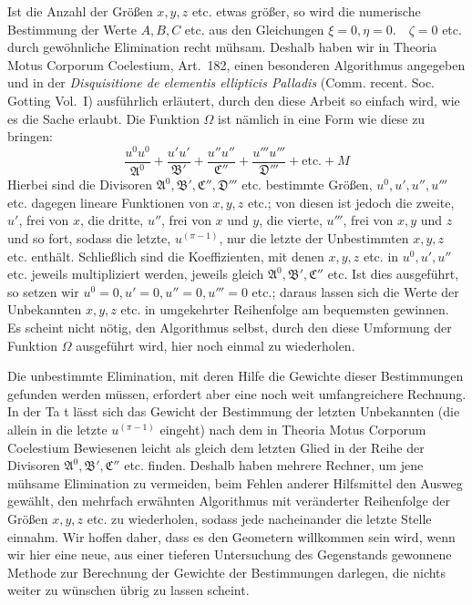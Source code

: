 Ist die Anzahl der Größen \(x,y,z\) etc. etwas größer, so wird die numerische Bestimmung der Werte \(A,B,C\) etc. aus den Gleichungen \(\xi=0,\allowbreak\eta=0.\quad\zeta=0\) etc. durch gewöhnliche Elimination recht mühsam. Deshalb haben wir in Theoria Motus Corporum Coelestium, Art.\ 182, einen besonderen Algorithmus angegeben und in der \textit{Disquisitione de elementis ellipticis Palladis} (Comm. recent. Soc. Gotting Vol.\ I) ausführlich erläutert, durch den diese Arbeit so einfach wird, wie es die Sache erlaubt. Die Funktion \(\Omega\) ist nämlich in eine Form wie diese zu bringen:
\[
\frac{u^0u^0}{\mathfrak{A}^0}+\frac{u'u'}{\mathfrak{B}'}+\frac{u''u''}{\mathfrak{C}''}+\frac{u'''u'''}{\mathfrak{D}'''}+\text{etc.}+M
\]
Hierbei sind die Divisoren \(\mathfrak{A}^0,\mathfrak{B}',\mathfrak{C}'',\mathfrak{D}'''\) etc. bestimmte Größen, \(u^0,u',u'',u'''\) etc. dagegen lineare Funktionen von \(x,y,z\) etc.; von diesen ist jedoch die zweite, \(u'\), frei von \(x\), die dritte, \(u''\), frei von \(x\) und \(y\), die vierte, \(u'''\), frei von \(x,y\) und \(z\) und so fort, sodass die letzte, \(u^{(\pi-1)}\), nur die letzte der Unbestimmten \(x,y,z\) etc. enthält. Schließlich sind die Koeffizienten, mit denen \(x,y,z\) etc. in \(u^0,u',u''\) etc. jeweils multipliziert werden, jeweils gleich \(\mathfrak{A}^0,\mathfrak{B}',\mathfrak{C}''\) etc. Ist dies ausgeführt, so setzen wir \(u^0=0,\allowbreak u'=0,\allowbreak u''=0,\allowbreak u'''=0\) etc.; daraus lassen sich die Werte der Unbekannten \(x,y,z\) etc. in umgekehrter Reihenfolge am bequemsten gewinnen. Es scheint nicht nötig, den Algorithmus selbst, durch den diese Umformung der Funktion \(\Omega\) ausgeführt wird, hier noch einmal zu wiederholen.

Die unbestimmte Elimination, mit deren Hilfe die Gewichte dieser Bestimmungen gefunden werden müssen, erfordert aber eine noch weit umfangreichere Rechnung. In der Ta%
t lässt sich das Gewicht der Bestimmung der letzten Unbekannten (die allein in die letzte \(u^{(\pi-1)}\) eingeht) nach dem in Theoria Motus Corporum Coelestium Bewiesenen leicht als gleich dem letzten Glied in der Reihe der Divisoren \(\mathfrak{A}^0,\mathfrak{B}',\mathfrak{C}''\) etc. finden. Deshalb haben mehrere Rechner, um jene mühsame Elimination zu vermeiden, beim Fehlen anderer Hilfsmittel den Ausweg gewählt, den mehrfach erwähnten Algorithmus mit veränderter Reihenfolge der Größen \(x,y,z\) etc. zu wiederholen, sodass jede nacheinander die letzte Stelle einnahm. Wir hoffen daher, dass es den Geometern willkommen sein wird, wenn wir hier eine neue, aus einer tieferen Untersuchung des Gegenstands gewonnene Methode zur Berechnung der Gewichte der Bestimmungen darlegen, die nichts weiter zu wünschen übrig zu lassen scheint.

